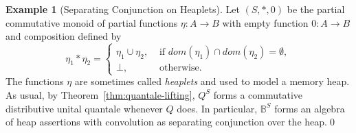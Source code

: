 \documentclass[12pt]{article}
\theoremstyle{definition}
\newtheorem{example}{Example}
\begin{document}
\begin{example}[Separating Conjunction on Heaplets]\label{ex:separating-conjunction-heaplets}
  Let $(S,\ast,0)$ be the partial commutative monoid of partial
  functions $\eta:A\to B$ with empty function $0:A\to B$ and
  composition defined by
    \begin{equation*}
      \eta_1\ast \eta_2 =
      \begin{cases}
        \eta_1\cup \eta_2,& \text{ if } \mathit{dom}(\eta_1)\cap\mathit{dom}(\eta_2)=\emptyset,\\
        \bot, & \text{ otherwise}.
      \end{cases}
    \end{equation*}
    The functions $\eta$ are sometimes called \emph{heaplets} and used
    to model a memory heap. As usual, by
    Theorem~\ref{thm:quantale-lifting}, $Q^S$ forms a commutative
    distributive unital quantale whenever $Q$ does. In particular,
    $\mathbb{B}^S$ forms an algebra of heap assertions with
    convolution as separating conjunction over the heap.\qed
\end{example}
\end{document}
